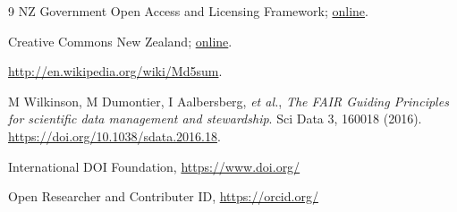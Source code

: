 \begin{thebibliography}{9}
 NZ Government Open Access and Licensing Framework; \href{https://www.data.govt.nz/toolkit/policies/nzgoal}{online}.

 Creative Commons New Zealand; \href{https://network.creativecommons.org/chapter/cc-aotearoa-new-zealand}{online}. 

 \url{http://en.wikipedia.org/wiki/Md5sum}. 

M Wilkinson, M Dumontier, I Aalbersberg, \textit{et al.}, \textit{The FAIR Guiding Principles for scientific data management and stewardship}. Sci Data 3, 160018 (2016). \url{https://doi.org/10.1038/sdata.2016.18}.

 International DOI Foundation, \url{https://www.doi.org/}

 Open Researcher and Contributer ID, \url{https://orcid.org/}

\end{thebibliography}
\endgroup